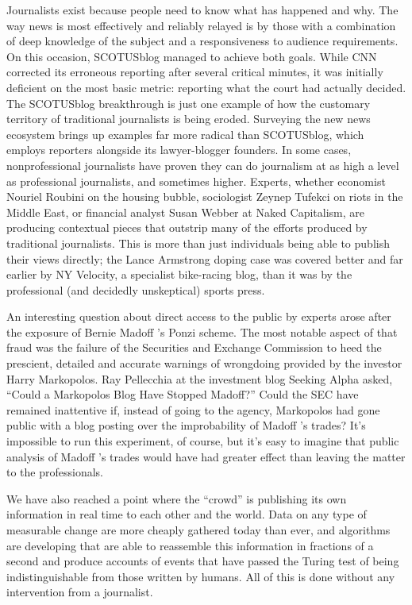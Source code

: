 Journalists exist because people need to know what has happened and why. The
way news is most effectively and reliably relayed is by those with a combination
of deep knowledge of the subject and a responsiveness to audience requirements.
On this occasion, SCOTUSblog managed to achieve both goals. While CNN
corrected its erroneous reporting after several critical minutes, it was initially
deficient on the most basic metric: reporting what the court had actually decided.
The SCOTUSblog breakthrough is just one example of how the customary
territory of traditional journalists is being eroded. Surveying the new news ecosystem
brings up examples far more radical than SCOTUSblog, which employs
reporters alongside its lawyer-blogger founders. In some cases, nonprofessional
journalists have proven they can do journalism at as high a level as professional
journalists, and sometimes higher. Experts, whether economist Nouriel Roubini
on the housing bubble, sociologist Zeynep Tufekci on riots in the Middle East,
or financial analyst Susan Webber at Naked Capitalism, are producing contextual
pieces that outstrip many of the efforts produced by traditional journalists. This
is more than just individuals being able to publish their views directly; the Lance
Armstrong doping case was covered better and far earlier by NY Velocity, a specialist
bike-racing blog, than it was by the professional (and decidedly unskeptical)
sports press.

An interesting question about direct access to the public by experts arose after the
exposure of Bernie Madoff ’s Ponzi scheme. The most notable aspect of that fraud
was the failure of the Securities and Exchange Commission to heed the prescient,
detailed and accurate warnings of wrongdoing provided by the investor Harry
Markopolos. Ray Pellecchia at the investment blog Seeking Alpha asked, ``Could
a Markopolos Blog Have Stopped Madoff?'' Could the SEC have remained inattentive
if, instead of going to the agency, Markopolos had gone public with a
blog posting over the improbability of Madoff ’s trades? It’s impossible to run this
experiment, of course, but it’s easy to imagine that public analysis of Madoff ’s
trades would have had greater effect than leaving the matter to the professionals.

We have also reached a point where the ``crowd'' is publishing its own information
in real time to each other and the world. Data on any type of measurable
change are more cheaply gathered today than ever, and algorithms are developing
that are able to reassemble this information in fractions of a second and
produce accounts of events that have passed the Turing test of being indistinguishable
from those written by humans. All of this is done without any intervention
from a journalist.

